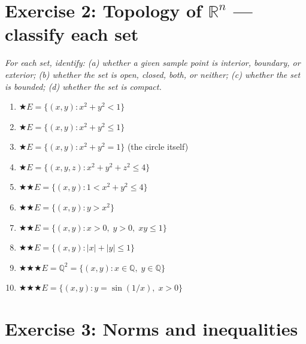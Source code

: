 \documentclass[12pt,a4paper]{article}
\newcommand{\easy}{{\color{green!60!black}$\bigstar$}}
\newcommand{\medium}{{\color{orange}$\bigstar\bigstar$}}
\newcommand{\hard}{{\color{red}$\bigstar\bigstar\bigstar$}}
\begin{document}
\section*{Exercise 2: Topology of $\mathbb{R}^n$ --- classify each set}

\emph{For each set, identify:
(a) whether a given sample point is interior, boundary, or exterior;
(b) whether the set is open, closed, both, or neither;
(c) whether the set is bounded;
(d) whether the set is compact.}

\begin{enumerate}[leftmargin=*, label=(\alph*)]

\item \easy\quad $E = \{(x,y) : x^2+y^2 < 1\}$

\item \easy\quad $E = \{(x,y) : x^2+y^2 \le 1\}$

\item \easy\quad $E = \{(x,y) : x^2+y^2 = 1\}$ \quad (the circle itself)

\item \easy\quad $E = \{(x,y,z) : x^2+y^2+z^2 \le 4\}$

\item \medium\quad $E = \{(x,y) : 1 < x^2+y^2 \le 4\}$

\item \medium\quad $E = \{(x,y) : y > x^2\}$

\item \medium\quad $E = \{(x,y) : x > 0,\; y > 0,\; xy \le 1\}$

\item \medium\quad $E = \{(x,y) : |x|+|y| \le 1\}$

\item \hard\quad $E = \mathbb{Q}^2 = \{(x,y) : x\in\mathbb{Q},\; y\in\mathbb{Q}\}$

\item \hard\quad $E = \{(x,y) : y = \sin(1/x),\; x > 0\}$

\end{enumerate}

\section*{Exercise 3: Norms and inequalities}
\end{document}
